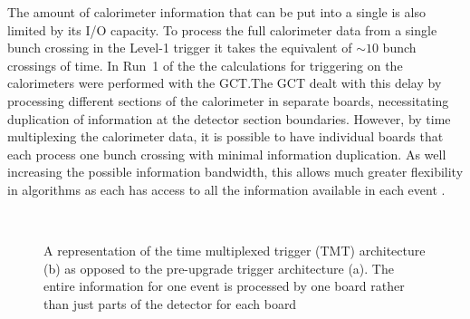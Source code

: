 The amount of calorimeter information that can be put into a single
\FPGA is also limited by its I/O capacity. To process the full
calorimeter data from a single bunch crossing in the Level-1 trigger
it takes the equivalent of $\sim10$ bunch crossings of time. In Run~1
of the \LHC the calculations for triggering on the calorimeters were
performed with the \ac{GCT}.The \ac{GCT} dealt with this delay by
processing different sections of the calorimeter in separate boards,
necessitating duplication of information at the detector section
boundaries. However, by time multiplexing the calorimeter data, it is
possible to have individual \FPGA boards that each process one bunch
crossing with minimal information duplication. As well increasing the
possible information bandwidth, this allows much greater flexibility
in algorithms as each \FPGA has access to all the information available
in each event \cite{1748-0221-9-10-C10034,1748-0221-7-01-C01060}. 

\begin{figure}[!t]
  \centering
  ~~
   \\
  \caption{A representation of the time multiplexed trigger (TMT)
  architecture (b) as opposed to the pre-upgrade trigger architecture
  (a). The entire information for one event is processed by one board
  rather than just parts of the detector for each board \cite{1748-0221-9-10-C10034}}
  \label{fig:tmt}
\end{figure}

